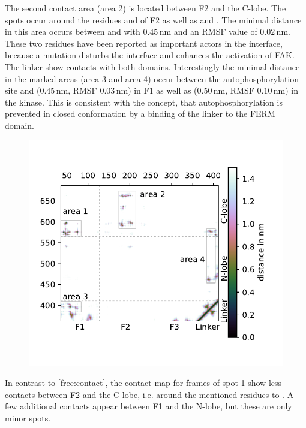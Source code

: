 The second contact area (area 2) is located between F2 and the C-lobe. The spots occur around the residues  and  of F2 as well as  and . The minimal distance in this area occurs between  and  with $0.45\,\si{\nano\metre}$ and an RMSF value of $0.02\,\si{\nano\metre}$. These two residues have been reported as important actors in the interface, because a mutation disturbs the interface and enhances the activation of FAK.\\
The linker show contacts with both domains. Interestingly the minimal distance in the marked areas (area 3 and area 4) occur between the autophosphorylation site  and  ($0.45\,\si{\nano\metre}$, RMSF $0.03\,\si{\nano\metre}$) in F1 as well as  ($0.50\,\si{\nano\metre}$, RMSF $0.10\,\si{\nano\metre}$) in the kinase. This is consistent with the concept, that autophosphorylation is prevented in closed conformation by a binding of the linker to the FERM domain.
%
%
%
\begin{figure}
	\centering
	\includegraphics[width=.7\textwidth]{figures/results/contactmap_free}
	\label{free:contact}
\end{figure}
%
%
%
In contrast to \autoref{free:contact}, the contact map for frames of spot 1 show less contacts between F2 and the C-lobe, i.e. around the mentioned residues  to . A few additional contacts appear between F1 and the N-lobe, but these are only minor spots.